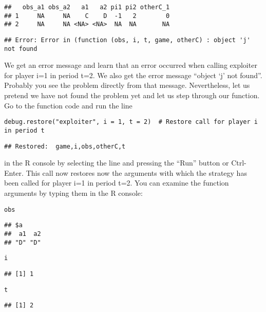 \documentclass[]{article}
\begin{document}
\begin{verbatim}
##   obs_a1 obs_a2   a1   a2 pi1 pi2 otherC_1
## 1     NA     NA    C    D  -1   2        0
## 2     NA     NA <NA> <NA>  NA  NA       NA
\end{verbatim}

\begin{verbatim}
## Error: Error in (function (obs, i, t, game, otherC) : object 'j' not found
\end{verbatim}

We get an error message and learn that an error occurred when calling
exploiter for player i=1 in period t=2. We also get the error message
``object `j' not found''. Probably you see the problem directly from
that message. Nevertheless, let us pretend we have not found the problem
yet and let us step through our function. Go to the function code and
run the line

\begin{verbatim}
debug.restore("exploiter", i = 1, t = 2)  # Restore call for player i in period t
\end{verbatim}

\begin{verbatim}
## Restored:  game,i,obs,otherC,t
\end{verbatim}

in the R console by selecting the line and pressing the ``Run'' button
or Ctrl-Enter. This call now restores now the arguments with which the
strategy has been called for player i=1 in period t=2. You can examine
the function arguments by typing them in the R console:

\begin{verbatim}
obs
\end{verbatim}

\begin{verbatim}
## $a
##  a1  a2 
## "D" "D"
\end{verbatim}

\begin{verbatim}
i
\end{verbatim}

\begin{verbatim}
## [1] 1
\end{verbatim}

\begin{verbatim}
t
\end{verbatim}

\begin{verbatim}
## [1] 2
\end{verbatim}
\end{document}
